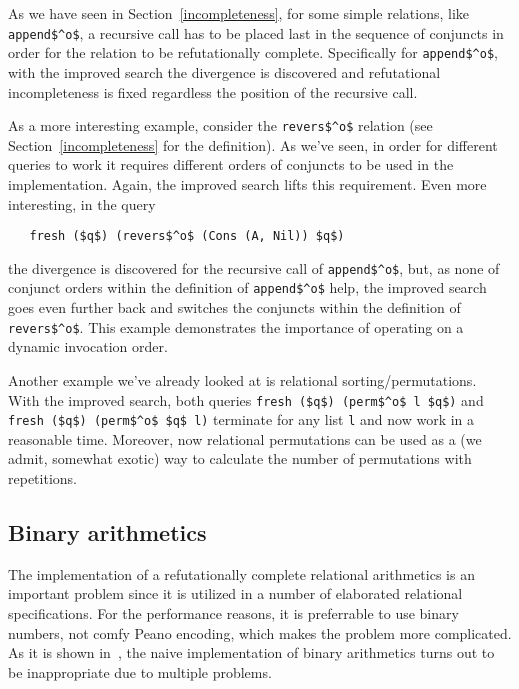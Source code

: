 As we have seen in Section~\ref{incompleteness}, for some simple relations, like \lstinline|append$^o$|,
a recursive call has to be placed last in the sequence of conjuncts in order for the 
relation to be refutationally complete. Specifically for \lstinline|append$^o$|, with the improved search 
the divergence is discovered and refutational incompleteness is fixed regardless the position of 
the recursive call.

As a more interesting example, consider the \lstinline|revers$^o$| relation (see Section~\ref{incompleteness}
for the definition). As we've seen, in order for different queries to work it requires different orders of conjuncts 
to be used in the implementation. Again, the improved search lifts this requirement.
Even more interesting, in the query 

\begin{lstlisting}
   fresh ($q$) (revers$^o$ (Cons (A, Nil)) $q$)
\end{lstlisting}

\noindent the divergence is discovered for the recursive call of \lstinline|append$^o$|, but,
as none of conjunct orders within the definition of \lstinline|append$^o$| help, the
improved search goes even further back and switches the conjuncts within the definition of
\lstinline|revers$^o$|. This example demonstrates the importance of operating on 
a dynamic invocation order.

Another example we've already looked at is relational sorting/permutations. 
With the improved search, both queries \lstinline|fresh ($q$) (perm$^o$ l $q$)| and 
\lstinline|fresh ($q$) (perm$^o$ $q$ l)| terminate for any list \lstinline|l| and now work
in a reasonable time. Moreover, now relational permutations can be used as a (we admit,
somewhat exotic) way to calculate the number of permutations with repetitions.

\subsection{Binary arithmetics}

The implementation of a refutationally complete relational arithmetics is an important problem since it is utilized
in a number of elaborated relational specifications. For the performance reasons, it is preferrable to use binary numbers,
not comfy Peano encoding, which makes the problem more complicated. As it is shown in~\cite{WillThesis}, the naive
implementation of binary arithmetics turns out to be inappropriate due to multiple problems. 


